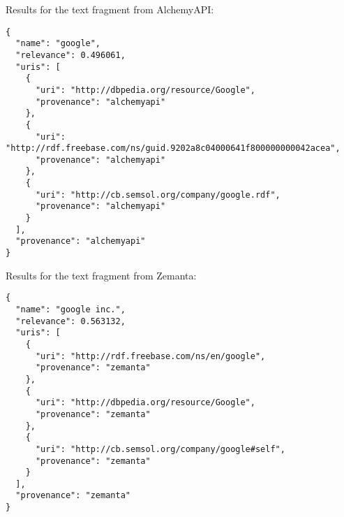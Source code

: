 \documentclass{acm_proc_article-sp}
\begin{document}
Results for the text fragment from AlchemyAPI:
\begin{verbatim}
{
  "name": "google",
  "relevance": 0.496061,
  "uris": [
    {
      "uri": "http://dbpedia.org/resource/Google",
      "provenance": "alchemyapi" 
    },
    {
      "uri": "http://rdf.freebase.com/ns/guid.9202a8c04000641f800000000042acea",
      "provenance": "alchemyapi" 
    },
    {
      "uri": "http://cb.semsol.org/company/google.rdf",
      "provenance": "alchemyapi" 
    } 
  ],
  "provenance": "alchemyapi" 
}
\end{verbatim}
Results for the text fragment from Zemanta:
\begin{verbatim}
{
  "name": "google inc.",
  "relevance": 0.563132,
  "uris": [
    {
      "uri": "http://rdf.freebase.com/ns/en/google",
      "provenance": "zemanta" 
    },
    {
      "uri": "http://dbpedia.org/resource/Google",
      "provenance": "zemanta" 
    },
    {
      "uri": "http://cb.semsol.org/company/google#self",
      "provenance": "zemanta" 
    } 
  ],
  "provenance": "zemanta" 
}
\end{verbatim}
\end{document}
